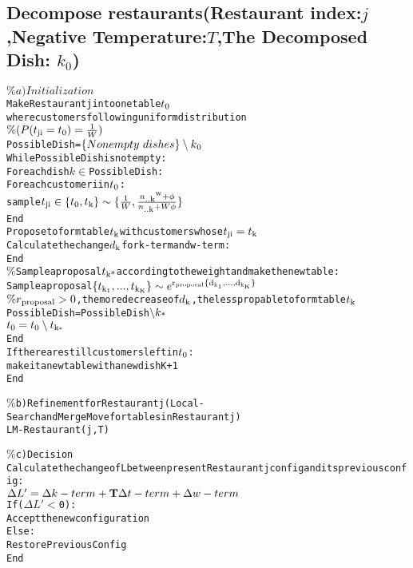 \documentclass{article}
\begin{document}
\subsection{Decompose restaurants(Restaurant index:$j$,Negative Temperature:$T$,The Decomposed Dish: $k_{0}$)}
\begin{alltt}
\(\%a) Initialization\)
Make Restaurant j into one table \(t\textsubscript{0}\) where customers following uniform distribution
\(\%(P(t\textsubscript{ji}=t\textsubscript{0})=\frac{1}{W})\)      
Possible Dish=\(\{Nonempty \ dishes\}\setminus k\textsubscript{0}\)      
While Possible Dish is not empty:      
      For each dish \(k\in\)Possible Dish:          
          For each customer i in \(t\textsubscript{0}\):
              sample \(t\textsubscript{ji}\in\{t\textsubscript{0},t\textsubscript{k}\}\sim\{\frac{1}{W},\frac{n\textsubscript{..k}\textsuperscript{w}+\phi}{n\textsubscript{..k}+W\phi}\}\)                
          End
      Propose to form table \(t\textsubscript{k}\) with customers whose \(t\textsubscript{ji}=t\textsubscript{k}\)
      Calculate the change \(d\textsubscript{k}\) for k-term and w-term:
      End
      \(\%\)Sample a proposal \(t\textsubscript{k*}\) according to the weight and make the new table:
      Sample a proposal \(\{t\textsubscript{k\textsubscript{1}},...,t\textsubscript{k\textsubscript{K}}\}\sim e\textsuperscript{r\textsubscript{proposal}\{d\textsubscript{k\textsubscript{1}},...,d\textsubscript{k\textsubscript{K}}\}}\)
      \(\%r\textsubscript{proposal}>0\), the more decrease of \(d\textsubscript{k}\), the less propable to form table \(t\textsubscript{k}\)
      Possible Dish=Possible Dish\(\setminus k\textsubscript{*}\)
      \(t\textsubscript{0}=t\textsubscript{0} \setminus t\textsubscript{k\textsubscript{*}}\)
End
If there are still customers left in \(t\textsubscript{0}\):
   make it a new table with a new dish K+1
End

\(\%\)b)Refinement for Restaurant j(Local-Search and Merge Move for tables in Restaurant j)
LM-Restaurant(j,T)

\(\%\)c)Decision
Calculate the change of L between present Restaurant j config and its previous config: 
\(\Delta L'=\Delta k-term+{\bf T}\Delta t-term+\Delta w-term\)
If(\(\Delta L'<\)0):
    Accept the new configuration
Else:
    Restore Previous Config
End    
\end{alltt}
\end{document}
